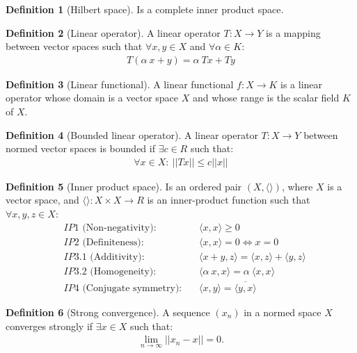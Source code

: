 \documentclass{article}
\theoremstyle{definition}
\newtheorem{definition}{Definition}
\begin{document}
\begin{definition}[Hilbert space]
  Is a complete inner product space.
\end{definition}

\begin{definition}[Linear operator]
  A linear operator $T: X \longrightarrow Y$ is a mapping between vector spaces such that $\forall x, y \in X$ and $\forall \alpha \in K$:
  \begin{align*}
    T(\alpha \: x+y) = \alpha \: Tx + Ty
  \end{align*}
\end{definition}

\begin{definition}[Linear functional]
  A linear functional $f: X \longrightarrow K$ is a linear operator whose domain is a vector space $X$ and whose range is the scalar field $K$ of $X$.
\end{definition}

\begin{definition}[Bounded linear operator]
  A linear operator $T: X \longrightarrow Y$ between normed vector spaces is bounded if $\exists c \in R$ such that:
  \begin{align*}
    \forall x \in X: \: ||Tx|| \leq c ||x||
  \end{align*}
\end{definition}

\begin{definition}[Inner product space]
  Is an ordered pair $(X, \langle \rangle)$, where $X$ is a vector space, and $\langle \rangle: X \times X \longrightarrow R$ is an inner-product function such that $\forall x,y,z \in X$:
  \begin{align*}
    &IP1 \text{ (Non-negativity)}: &&\langle x, x\rangle \geq 0 \\
    &IP2 \text{ (Definiteness)}: &&\langle x, x\rangle = 0 \iff x = 0 \\
    &IP3.1 \text{ (Additivity)}: &&\langle x + y, z\rangle = \langle x, z\rangle + \langle y, z\rangle\\
    &IP3.2 \text{ (Homogeneity)}: &&\langle \alpha \: x, x\rangle = \alpha \: \langle x, x\rangle \\
    &IP4 \text{ (Conjugate symmetry)}: &&\langle x, y\rangle = \overline{\langle y, x\rangle}
  \end{align*}    
\end{definition}

\begin{definition}[Strong convergence]
  A sequence $(x_n)$ in a normed space $X$ converges strongly if $\exists x \in X$ such that:
  \begin{align*}
    \lim_{n \to \infty} ||x_n - x|| = 0.
  \end{align*}  
\end{definition}
\end{document}
